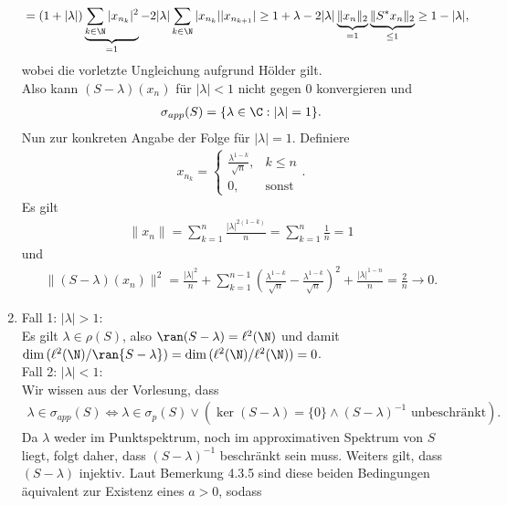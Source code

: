 \begin{solution}
\begin{enumerate}[label = (\alph*)]
\begin{align*}
    &= (1 + |\lambda|)\underbrace{\sum_{k \in \N}|x_{n_k}|^2}_{= 1} - 2|\lambda|\sum_{k \in \N}|x_{n_k}| |x_{n_{k+1}}|
    \geq 1 + \lambda - 2|\lambda|\underbrace{\|x_n\|_2}_{=1}\underbrace{\|S^*x_n\|_2}_{\leq 1} \geq 1 - |\lambda|,
  \end{align*}
  wobei die vorletzte Ungleichung aufgrund Hölder gilt. \\
  Also kann $(S - \lambda)(x_n)$ für $|\lambda| < 1$ nicht gegen $0$ konvergieren und
  \begin{align*}
    \sigma_{app}(S) = \{\lambda \in \C: |\lambda| = 1 \}.
  \end{align*}
  Nun zur konkreten Angabe der Folge für $|\lambda| = 1$. Definiere
  \begin{align*}
    x_{n_k} = \begin{cases}
      \frac{\lambda^{1-k}}{\sqrt{n}}, & k \leq n \\
      0, & \text{sonst}
    \end{cases}.
  \end{align*}
  Es gilt
  \begin{align*}
    \|x_n\| = \sum_{k=1}^n\frac{|\lambda|^{2(1-k)}}{n} = \sum_{k=1}^n\frac{1}{n} = 1
  \end{align*}
  und
  \begin{align*}
    \|(S - \lambda)(x_n)\|^2 = \frac{|\lambda|^2}{n} + \sum_{k = 1}^{n-1} \left(\frac{\lambda^{1-k}}{\sqrt{n}}-
    \frac{\lambda^{1-k}}{\sqrt{n}}\right)^2 +\frac{|\lambda|^{1-n}}{n} = \frac{2}{n} \to 0.
  \end{align*}
  \item Fall 1: $|\lambda| > 1$: \\
  Es gilt $\lambda \in \rho(S)$, also $\ran(S - \lambda) = \ell^2(\N)$ und damit
  $\dim{(\ell^2(\N) / \ran{S - \lambda})} = \dim{(\ell^2(\N) / \ell^2(\N))} = 0$. \\
  Fall 2: $|\lambda| < 1$: \\
  Wir wissen aus der Vorlesung, dass
  \begin{align*}
    \lambda \in \sigma_{app}(S) \iff \lambda \in \sigma_p(S) \lor (\ker(S - \lambda) = \{0\} \land (S - \lambda)^{-1} \text{ unbeschränkt}).
  \end{align*}
  Da $\lambda$ weder im Punktspektrum, noch im approximativen Spektrum von $S$ liegt,
  folgt daher, dass $(S - \lambda)^{-1}$ beschränkt sein muss. Weiters gilt, dass $(S - \lambda)$
  injektiv. Laut Bemerkung 4.3.5 sind diese beiden Bedingungen äquivalent zur Existenz eines $a > 0$, sodass
  \begin{align*}

\end{align*}
\end{enumerate}
\end{solution}

